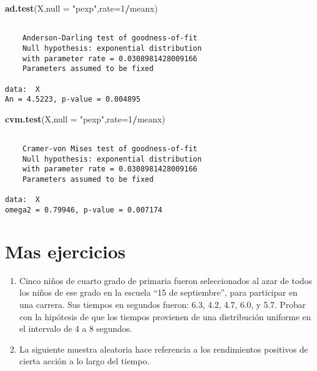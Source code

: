 \documentclass[a4paper,oneside,openany]{book}
\newenvironment{Shaded}{\begin{snugshade}}{\end{snugshade}}
\newcommand{\KeywordTok}[1]{\textcolor[rgb]{0.13,0.29,0.53}{\textbf{#1}}}
\newcommand{\DataTypeTok}[1]{\textcolor[rgb]{0.13,0.29,0.53}{#1}}
\newcommand{\DecValTok}[1]{\textcolor[rgb]{0.00,0.00,0.81}{#1}}
\newcommand{\StringTok}[1]{\textcolor[rgb]{0.31,0.60,0.02}{#1}}
\newcommand{\OperatorTok}[1]{\textcolor[rgb]{0.81,0.36,0.00}{\textbf{#1}}}
\newcommand{\NormalTok}[1]{#1}
\begin{document}
\begin{Shaded}
\begin{Highlighting}[]
\KeywordTok{ad.test}\NormalTok{(X,}\DataTypeTok{null =} \StringTok{"pexp"}\NormalTok{,}\DataTypeTok{rate=}\DecValTok{1}\OperatorTok{/}\NormalTok{meanx)}
\end{Highlighting}
\end{Shaded}

\begin{verbatim}

    Anderson-Darling test of goodness-of-fit
    Null hypothesis: exponential distribution
    with parameter rate = 0.0308981428009166
    Parameters assumed to be fixed

data:  X
An = 4.5223, p-value = 0.004895
\end{verbatim}

\begin{Shaded}
\begin{Highlighting}[]
\KeywordTok{cvm.test}\NormalTok{(X,}\DataTypeTok{null =} \StringTok{"pexp"}\NormalTok{,}\DataTypeTok{rate=}\DecValTok{1}\OperatorTok{/}\NormalTok{meanx)}
\end{Highlighting}
\end{Shaded}

\begin{verbatim}

    Cramer-von Mises test of goodness-of-fit
    Null hypothesis: exponential distribution
    with parameter rate = 0.0308981428009166
    Parameters assumed to be fixed

data:  X
omega2 = 0.79946, p-value = 0.007174
\end{verbatim}

\section{Mas ejercicios}\label{mas-ejercicios}

\begin{enumerate}
\def\labelenumi{\arabic{enumi}.}
\item
  Cinco niños de cuarto grado de primaria fueron seleccionados al azar
  de todos los niños de ese grado en la escuela ``15 de septiembre'',
  para participar en una carrera. Sus tiempos en segundos fueron: 6.3,
  4.2, 4.7, 6.0, y 5.7. Probar con la hipótesis de que los tiempos
  provienen de una distribución uniforme en el intervalo de 4 a 8
  segundos.
\item
  La siguiente muestra aleatoria hace referencia a los rendimientos
  positivos de cierta acción a lo largo del tiempo.
\end{enumerate}
\end{document}
